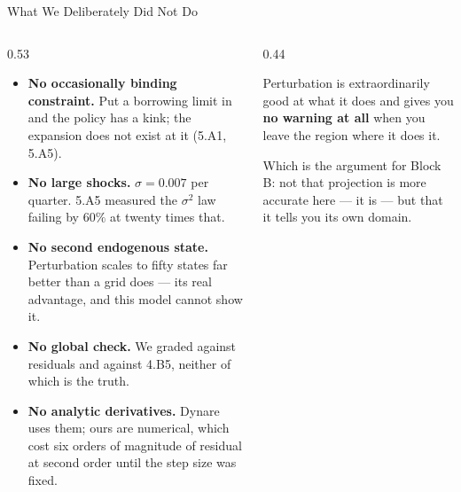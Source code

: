 \begin{frame}{What We Deliberately Did Not Do}
\begin{columns}[T]
\begin{column}{0.53\textwidth}
\small
\begin{itemize}\small
  \item \textbf{No occasionally binding constraint.} Put a borrowing limit in and the policy has a kink; the expansion does not exist at it (5.A1, 5.A5).
  \item \textbf{No large shocks.} $\sigma=0.007$ per quarter. 5.A5 measured the $\sigma^{2}$ law failing by $60\%$ at twenty times that.
  \item \textbf{No second endogenous state.} Perturbation scales to fifty states far better than a grid does --- its real advantage, and this model cannot show it.
  \item \textbf{No global check.} We graded against residuals and against 4.B5, neither of which is the truth.
  \item \textbf{No analytic derivatives.} Dynare uses them; ours are numerical, which cost six orders of magnitude of residual at second order until the step size was fixed.
\end{itemize}
\end{column}
\begin{column}{0.44\textwidth}
\begin{cautionbox}[title=\textbf{The honest summary}]\small
Perturbation is extraordinarily good at what it does and gives you \textbf{no warning at all} when you leave the region where it does it.
\end{cautionbox}
\medskip
\begin{examplebox}\footnotesize
Which is the argument for Block B: not that projection is more accurate here --- it is --- but that it tells you its own domain.
\end{examplebox}
\end{column}
\end{columns}
\end{frame}

